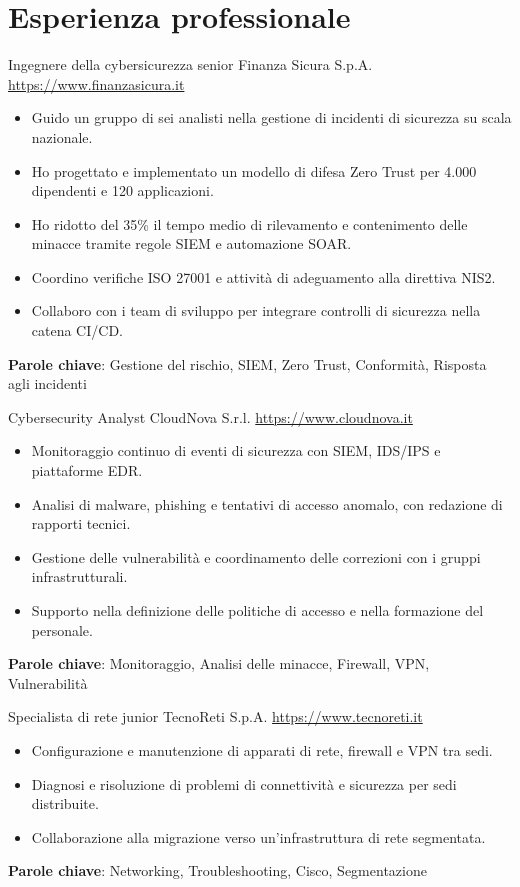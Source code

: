 \documentclass[a4paper, serif, 10pt]{moderncv}
\begin{document}
\section{Esperienza professionale}

        {Ingegnere della cybersicurezza senior}
        {Finanza Sicura S.p.A.}
        {\url{https://www.finanzasicura.it}}
        {}
        {\begin{itemize}
\item Guido un gruppo di sei analisti nella gestione di incidenti di sicurezza su scala nazionale.
\item Ho progettato e implementato un modello di difesa Zero Trust per 4.000 dipendenti e 120 applicazioni.
\item Ho ridotto del 35\% il tempo medio di rilevamento e contenimento delle minacce tramite regole SIEM e automazione SOAR.
\item Coordino verifiche ISO 27001 e attività di adeguamento alla direttiva NIS2.
\item Collaboro con i team di sviluppo per integrare controlli di sicurezza nella catena CI/CD.
\end{itemize}
\textbf{Parole chiave}: Gestione del rischio, SIEM, Zero Trust, Conformità, Risposta agli incidenti}

        {Cybersecurity Analyst}
        {CloudNova S.r.l.}
        {\url{https://www.cloudnova.it}}
        {}
        {\begin{itemize}
\item Monitoraggio continuo di eventi di sicurezza con SIEM, IDS/IPS e piattaforme EDR.
\item Analisi di malware, phishing e tentativi di accesso anomalo, con redazione di rapporti tecnici.
\item Gestione delle vulnerabilità e coordinamento delle correzioni con i gruppi infrastrutturali.
\item Supporto nella definizione delle politiche di accesso e nella formazione del personale.
\end{itemize}
\textbf{Parole chiave}: Monitoraggio, Analisi delle minacce, Firewall, VPN, Vulnerabilità}

        {Specialista di rete junior}
        {TecnoReti S.p.A.}
        {\url{https://www.tecnoreti.it}}
        {}
        {\begin{itemize}
\item Configurazione e manutenzione di apparati di rete, firewall e VPN tra sedi.
\item Diagnosi e risoluzione di problemi di connettività e sicurezza per sedi distribuite.
\item Collaborazione alla migrazione verso un'infrastruttura di rete segmentata.
\end{itemize}
\textbf{Parole chiave}: Networking, Troubleshooting, Cisco, Segmentazione}
\end{document}
